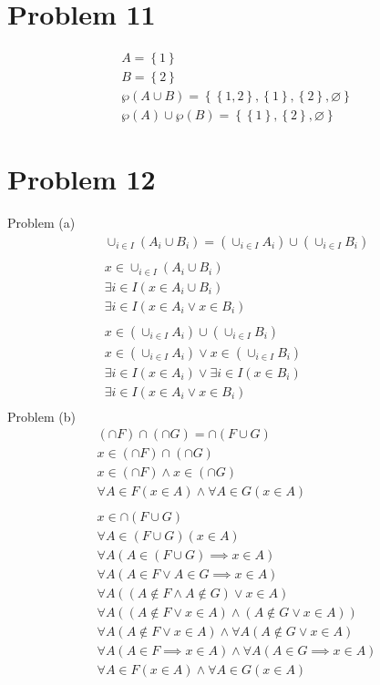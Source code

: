 \documentclass{article}
\begin{document}
\section{Problem 11}
\begin{align*}
 A = \left\{1 \right\} \\
 B = \left\{2 \right\} \\
 \wp(A \cup B) = \left\{\left\{1,2 \right\},\left\{1 \right\}, \left\{2 \right\}, \varnothing  \right\} \\
 \wp(A) \cup \wp(B) = \left\{ \left\{1 \right\},\left\{2 \right\}, \varnothing  \right\} 
\end{align*}

\section{Problem 12}
Problem (a)
\begin{align*}
  \cup_{i \in I}(A_i \cup B_i) = (\cup_{i \in I}A_i) \cup (\cup_{i \in  I}B_i) \\\\
  x \in \cup_{i \in I}(A_i \cup B_i) \\
  \exists i \in I(x \in A_i \cup B_i) \\
  \exists i \in I(x \in A_i \lor x \in B_i)\\\\
  x \in (\cup_{i \in I}A_i) \cup (\cup_{i \in I}B_i) \\
  x \in (\cup_{i \in I}A_i) \lor x \in (\cup_{i \in I}B_i) \\
  \exists i \in I(x \in A_i) \lor \exists i \in I(x \in B_i) \\
  \exists i \in I(x \in A_i \lor x \in B_i) \\
\end{align*}
Problem (b)
\begin{align*}
  (\cap F) \cap (\cap G) = \cap(F \cup G)\\
  x \in (\cap F) \cap (\cap G) \\
  x \in (\cap F) \land x \in (\cap G) \\
  \forall A \in F(x \in A) \land \forall A \in G(x \in A)\\\\
  x \in \cap(F \cup G) \\
  \forall A \in (F \cup G)(x \in A)\\
  \forall A(A \in (F \cup G) \implies x \in A) \\
  \forall A(A \in F \lor A \in G \implies x \in A)\\
  \forall A((A \notin F \land A \notin G) \lor x \in A)\\
  \forall A((A \notin F \lor x \in A) \land (A \notin G \lor x \in A))\\
  \forall A(A \notin F \lor x \in A) \land \forall A(A \notin G \lor x \in A)\\
  \forall A(A \in F \implies x \in A) \land \forall A(A \in G \implies x \in A)\\
  \forall A \in F(x \in A) \land \forall A \in G(x \in A)\\
\end{align*}
\end{document}

